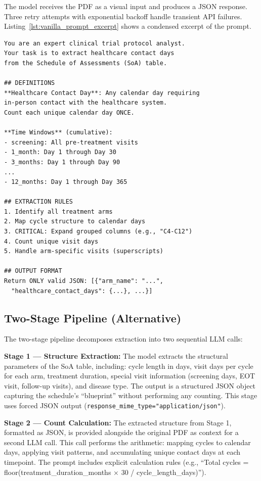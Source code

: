 \documentclass[11pt]{article}
\begin{document}
The model receives the PDF as a visual input and produces a JSON response. Three retry attempts with exponential backoff handle transient API failures. Listing~\ref{lst:vanilla_prompt_excerpt} shows a condensed excerpt of the prompt.

\begin{lstlisting}[caption={Condensed excerpt of the vanilla extraction prompt.}, label={lst:vanilla_prompt_excerpt}]
You are an expert clinical trial protocol analyst.
Your task is to extract healthcare contact days
from the Schedule of Assessments (SoA) table.

## DEFINITIONS
**Healthcare Contact Day**: Any calendar day requiring
in-person contact with the healthcare system.
Count each unique calendar day ONCE.

**Time Windows** (cumulative):
- screening: All pre-treatment visits
- 1_month: Day 1 through Day 30
- 3_months: Day 1 through Day 90
...
- 12_months: Day 1 through Day 365

## EXTRACTION RULES
1. Identify all treatment arms
2. Map cycle structure to calendar days
3. CRITICAL: Expand grouped columns (e.g., "C4-C12")
4. Count unique visit days
5. Handle arm-specific visits (superscripts)

## OUTPUT FORMAT
Return ONLY valid JSON: [{"arm_name": "...",
  "healthcare_contact_days": {...}, ...}]
\end{lstlisting}

\subsection{Two-Stage Pipeline (Alternative)}

The two-stage pipeline decomposes extraction into two sequential LLM calls:

\textbf{Stage 1 --- Structure Extraction:} The model extracts the structural parameters of the SoA table, including: cycle length in days, visit days per cycle for each arm, treatment duration, special visit information (screening days, EOT visit, follow-up visits), and disease type. The output is a structured JSON object capturing the schedule's ``blueprint'' without performing any counting. This stage uses forced JSON output (\texttt{response\_mime\_type="application/json"}).

\textbf{Stage 2 --- Count Calculation:} The extracted structure from Stage 1, formatted as JSON, is provided alongside the original PDF as context for a second LLM call. This call performs the arithmetic: mapping cycles to calendar days, applying visit patterns, and accumulating unique contact days at each timepoint. The prompt includes explicit calculation rules (e.g., ``Total cycles = floor(treatment\_duration\_months $\times$ 30 / cycle\_length\_days)'').
\end{document}
